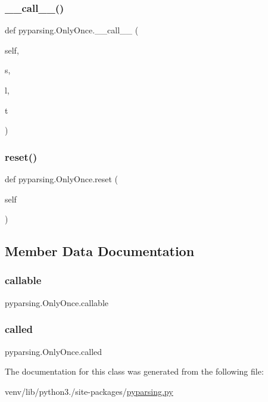 \subsubsection{\texorpdfstring{\+\_\+\+\_\+call\+\_\+\+\_\+()}{\_\_call\_\_()}}
{\footnotesize\ttfamily def pyparsing.\+Only\+Once.\+\_\+\+\_\+call\+\_\+\+\_\+ (\begin{DoxyParamCaption}\item[{}]{self,  }\item[{}]{s,  }\item[{}]{l,  }\item[{}]{t }\end{DoxyParamCaption})}

\mbox{\label{classpyparsing_1_1OnlyOnce_a4861aa49333b67d8db067f23c1f0acb9}} 
\subsubsection{\texorpdfstring{reset()}{reset()}}
{\footnotesize\ttfamily def pyparsing.\+Only\+Once.\+reset (\begin{DoxyParamCaption}\item[{}]{self }\end{DoxyParamCaption})}



\subsection{Member Data Documentation}
\mbox{\label{classpyparsing_1_1OnlyOnce_a623b2535c9035c5516c53e86b06464b8}} 
\subsubsection{\texorpdfstring{callable}{callable}}
{\footnotesize\ttfamily pyparsing.\+Only\+Once.\+callable}

\mbox{\label{classpyparsing_1_1OnlyOnce_ac7b815f6552deef754c23f190fe68da9}} 
\subsubsection{\texorpdfstring{called}{called}}
{\footnotesize\ttfamily pyparsing.\+Only\+Once.\+called}



The documentation for this class was generated from the following file\+:\begin{DoxyCompactItemize}
\item 
venv/lib/python3./site-\/packages/\hyperlink{pyparsing_8py}{pyparsing.\+py}\end{DoxyCompactItemize}
